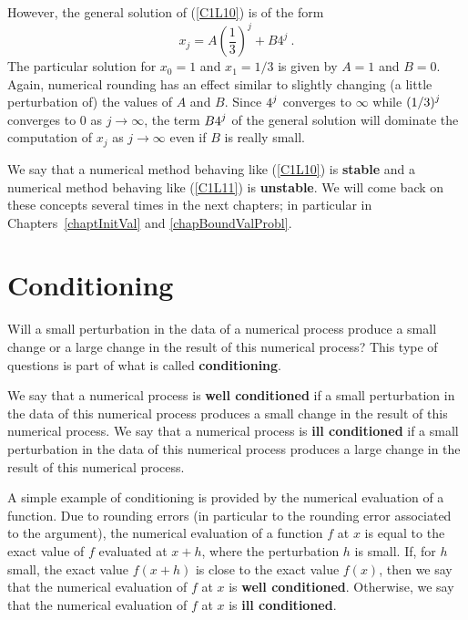 However, the general solution of
(\ref{C1L10}) is of the form
\[
x_j = A \left(\frac{1}{3}\right)^j + B 4^j \ .
\]
The particular solution for $x_0=1$ and $x_1 = 1/3$ is given
by $A=1$ and $B=0$.  Again, numerical rounding has an effect similar
to slightly changing (a little perturbation of) the values of $A$ and
$B$.  Since $\displaystyle 4^j$ converges to $\infty$ while
$\displaystyle (1/3)^j$ converges to
$0$ as $j\rightarrow \infty$, the term $\displaystyle B 4^j$ of the general
solution will dominate the computation of $x_j$ as $j\rightarrow
\infty$ even if $B$ is really small.

We say that a numerical method behaving like (\ref{C1L10})
is {\bfseries stable} and a numerical
method behaving like (\ref{C1L11}) is
{\bfseries unstable}.
We will come back on these concepts several times in the next
chapters; in particular in Chapters~\ref{chaptInitVal} and
\ref{chapBoundValProbl}.

\section{Conditioning}

Will a small perturbation in the data of a numerical process produce
a small change or a large change in the result of this
numerical process?  This type of questions is part of what is called
{\bfseries conditioning}.

We say that a numerical process is
{\bfseries well conditioned} if a
small perturbation in the data of this numerical process produces a
small change in the result of this numerical process.  We say that a
numerical process is
{\bfseries ill conditioned} if a small
perturbation in the data of this numerical process produces a large
change in the result of this numerical process.

A simple example of conditioning is provided by the numerical
evaluation of a function.  Due to rounding errors (in particular to the
rounding error associated to the argument), the numerical evaluation
of a function $f$ at $x$ is equal to the exact value of $f$ evaluated
at $x+h$, where the perturbation $h$ is small.  If, for $h$ small, the
exact value $f(x+h)$ is close to the exact value $f(x)$, then we say
that the numerical evaluation of $f$ at $x$ is
{\bfseries well conditioned}.  Otherwise, we
say that the numerical evaluation of $f$ at $x$ is
{\bfseries ill conditioned}.

